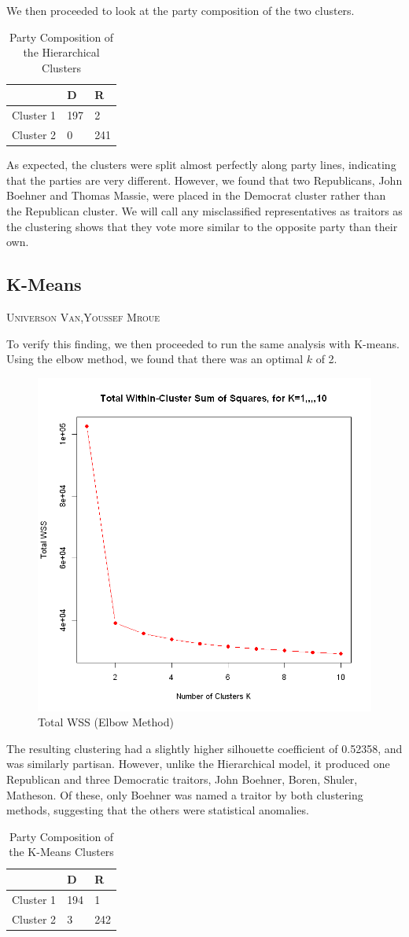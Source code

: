\documentclass[12pt]{article}
\makeatletter
\newcommand{\chapterauthor}[1]{%
	{\parindent0pt\vspace*{-10pt}%
		\linespread{1.1}\large\scshape#1%
		\par\nobreak\vspace*{10pt}}
	\@afterheading%
}
\makeatother
\begin{document}
We then proceeded to look at the party composition of the two clusters. 
\begin{table}[h]
	\caption{Party Composition of the Hierarchical Clusters}
	\centering
	\begin{tabular}{l|ll}
		& D & R \\
		\hline
		Cluster 1 & 197 & 2 \\
		Cluster 2 & 0 & 241
	\end{tabular}
\end{table}
As expected, the clusters were split almost perfectly along party lines, indicating that the parties are very different. However, we found that two Republicans, John Boehner and Thomas Massie, were placed in the Democrat cluster rather than the Republican cluster. We will call any misclassified representatives as traitors as the clustering shows that they vote more similar to the opposite party than their own. 
\FloatBarrier
\subsection{K-Means}
\chapterauthor{Universon Van,Youssef Mroue}
To verify this finding, we then proceeded to run the same analysis with K-means. Using the elbow method, we found that there was an optimal $k$ of 2. 
\begin{figure}[h]
	\caption{Total WSS (Elbow Method)}
	\centering
	\includegraphics[width=.5\textwidth]{Images/Elbow}
\end{figure}
The resulting clustering had a slightly higher silhouette coefficient of 0.52358, and was similarly partisan. However, unlike the Hierarchical model, it produced one Republican and three Democratic traitors, John Boehner, Boren, Shuler, Matheson. Of these, only Boehner was named a traitor by both clustering methods, suggesting that the others were statistical anomalies.  
\begin{table}[h]
	\caption{Party Composition of the K-Means Clusters}
	\centering
	\begin{tabular}{l|ll}
		& D & R \\
		\hline
		Cluster 1 & 194 & 1 \\
		Cluster 2 & 3 & 242
	\end{tabular}
\end{table}
\end{document}
